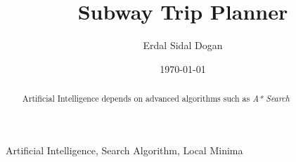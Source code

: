 \documentclass{IEEEtran}
\author{Erdal Sidal Dogan}
\date{\today}
\title{Subway Trip Planner}
\begin{document}
	\maketitle
	\begin{abstract}
		Artificial Intelligence depends on advanced algorithms such as \textit{A* Search}
	\end{abstract}
	
	\begin{IEEEkeywords}
		Artificial Intelligence, Search Algorithm, Local Minima
	\end{IEEEkeywords}
\end{document}
